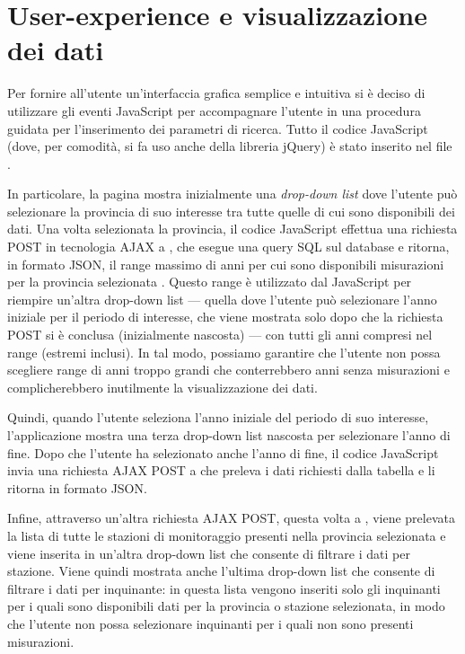 \section[User-experience e visualizzazione dei dati]{User-experience e
visualizzazione\\dei dati}

Per fornire all'utente un'interfaccia grafica semplice e intuitiva si è deciso
di utilizzare gli eventi JavaScript per accompagnare l'utente in una procedura
guidata per l'inserimento dei parametri di ricerca. Tutto il codice JavaScript
(dove, per comodità, si fa uso anche della libreria jQuery) è stato inserito nel
file .

In particolare, la pagina mostra inizialmente una \textit{drop-down list} dove
l'utente può selezionare la provincia di suo interesse tra tutte quelle di cui
sono disponibili dei dati. Una volta selezionata la provincia, il codice
JavaScript effettua una richiesta POST in tecnologia AJAX a
, che esegue una query SQL sul database e ritorna, in
formato JSON, il range massimo di anni per cui sono disponibili misurazioni per
la provincia selezionata . Questo range è utilizzato dal JavaScript per riempire
un'altra drop-down list --- quella dove l'utente può selezionare l'anno iniziale
per il periodo di interesse, che viene mostrata solo dopo che la richiesta POST
si è conclusa (inizialmente nascosta) --- con tutti gli anni compresi nel range
(estremi inclusi). In tal modo, possiamo garantire che l'utente non possa
scegliere range di anni troppo grandi che conterrebbero anni senza misurazioni e
complicherebbero inutilmente la visualizzazione dei dati.

Quindi, quando l'utente seleziona l'anno iniziale del periodo di suo interesse,
l'applicazione mostra una terza drop-down list nascosta per selezionare l'anno
di fine. Dopo che l'utente ha selezionato anche l'anno di fine, il codice
JavaScript invia una richiesta AJAX POST a  che
preleva i dati richiesti dalla tabella  e li ritorna in
formato JSON.

Infine, attraverso un'altra richiesta AJAX POST, questa volta a
, viene prelevata la lista di tutte le stazioni di
monitoraggio presenti nella provincia selezionata e viene inserita in un'altra
drop-down list che consente di filtrare i dati per stazione. Viene quindi
mostrata anche l'ultima drop-down list che consente di filtrare i dati per
inquinante: in questa lista vengono inseriti solo gli inquinanti per i quali
sono disponibili dati per la provincia o stazione selezionata, in modo che
l'utente non possa selezionare inquinanti per i quali non sono presenti
misurazioni.

